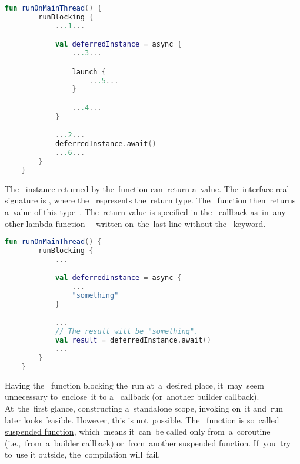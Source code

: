 \begin{lstlisting}[language=Kotlin, title={Numbers represent the~order of~execution}]
    fun runOnMainThread() {
        runBlocking {
            ...1...

            val deferredInstance = async {
                ...3...

                launch {
                    ...5...
                }

                ...4...
            }

            ...2...
            deferredInstance.await()
            ...6...
        }
    }
\end{lstlisting}
\newline

\noindent The~ instance returned by the~function  can~return a~value.
The~interface real signature is , where the~ represents the~return type.
The~ function then~returns a~value of this type~.
The~return value is specified in the~ callback as~in~any other \hyperref[kotlinlambda]{lambda function} --~written on~the~last line without the~ keyword.

\begin{lstlisting}[language=Kotlin]
    fun runOnMainThread() {
        runBlocking {
            ...

            val deferredInstance = async {
                ...
                "something"
            }

            ...
            // The result will be "something".
            val result = deferredInstance.await()
            ...
        }
    }
\end{lstlisting}
\newline

\warning Having the~ function blocking the~run at~a~desired place, it~may~seem unnecessary to~enclose~it to a~ callback (or~another builder callback).
At~the~first glance, constructing a~standalone scope, invoking  on~it and~run  later looks feasible.
However, this is not~possible.
The~ function is so~called \hyperref[kotlinsuspendfunction]{suspended function}, which~means it~can~be called only from~a~coroutine (i.e.,~from~a~builder callback) or~from~another suspended function.
If~you~try to~use it outside, the~compilation will~fail.


